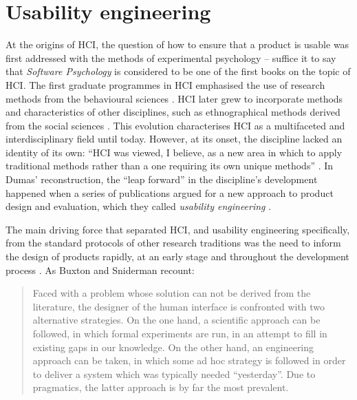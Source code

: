 \section{Usability engineering}\largerpage

At the origins of HCI, the question of how to ensure that a product is usable was first addressed with the methods of experimental psychology \citep{lewis2012} -- suffice it to say that  \textit{Software Psychology} is considered to be one of the first books on the topic of HCI. The first graduate programmes in HCI emphasised the use of research methods from the behavioural sciences \citep[55]{dumas2007great}. HCI later grew to incorporate methods and characteristics of other disciplines, such as ethnographical methods derived from the social sciences \citep{lazar2017research}. This evolution characterises HCI as a multifaceted and interdisciplinary field until today. However, at its onset, the discipline lacked an identity of its own: ``HCI was viewed, I believe, as a new area in which to apply traditional methods rather than a one requiring its own unique methods'' \citep[55]{dumas2007great}. In Dumas’ reconstruction, the ``leap forward'' in the discipline’s development happened when a series of publications argued for a new approach to product design and evaluation, which they called \textit{usability engineering} \citep{whiteside1988usability}.

The main driving force that separated HCI, and usability engineering specifically, from the standard protocols of other research traditions was the need to inform the design of products rapidly, at an early stage and throughout the development process \citep[5]{lewis2012}. As Buxton and Sniderman recount:

\begin{quote}
    Faced with a problem whose solution can not be derived from the literature, the designer of the human interface is confronted with two alternative strategies. On the one hand, a scientific approach can be followed, in which formal experiments are run, in an attempt to fill in existing gaps in our knowledge. On the other hand, an engineering approach can be taken, in which some ad hoc strategy is followed in order to deliver a system which was typically needed ``yesterday''. Due to pragmatics, the latter approach is by far the most prevalent. \citep[2]{buxton1980iteration}
\end{quote}

